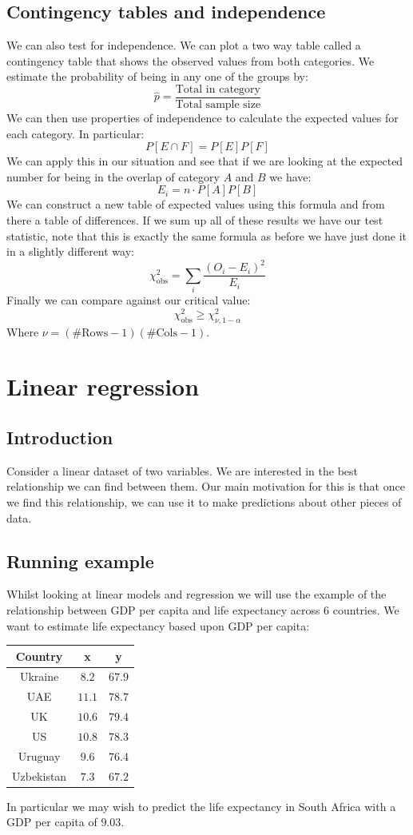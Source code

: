 \documentclass[12pt]{article}
\newcommand{\chisq}{\chi^2_{\text{obs}}}
\begin{document}
\subsection*{Contingency tables and independence}
We can also test for independence. We can plot a two way table called a contingency table that shows the observed values from both categories. We estimate the probability of being in any one of the groups by:
\[\hat{p}=\frac{\text{Total in category}}{\text{Total sample size}}\]
We can then use properties of independence to calculate the expected values for each category. In particular:
\[P[E\cap F]=P[E]P[F]\]
We can apply this in our situation and see that if we are looking at the expected number for being in the overlap of category \(A\) and \(B\) we have:
\[E_i=n\cdot P[A]P[B]\]
We can construct a new table of expected values using this formula and from there a table of differences. If we sum up all of these results we have our test statistic, note that this is exactly the same formula as before we have just done it in a slightly different way:
\[\chisq = \sum_i\frac{(O_i-E_i)^2}{E_i}\]
Finally we can compare against our critical value:
\[\chisq\geq \chi^2_{\nu,1-\alpha}\]
Where \(\nu=(\#\text{Rows}-1)(\#\text{Cols}-1)\).
\section{Linear regression}
\subsection*{Introduction}
Consider a linear dataset of two variables. We are interested in the best relationship we can find between them. Our main motivation for this is that once we find this relationship, we can use it to make predictions about other pieces of data.
\subsection*{Running example}
Whilst looking at linear models and regression we will use the example of the relationship between GDP per capita and life expectancy across 6 countries. We want to estimate life expectancy based upon GDP per capita:
\begin{table}[H]
    \centering
    \begin{tabular}{c|c|c}
        \textbf{Country} & \textbf{x} & \textbf{y} \\ \hline 
        Ukraine & \(8.2\) & \(67.9\) \\
        UAE & \(11.1\) & \(78.7\) \\
        UK & \(10.6\) & \(79.4\) \\
        US & \(10.8\) & \(78.3\) \\
        Uruguay & \(9.6\) & \(76.4\) \\
        Uzbekistan & \(7.3\) & \(67.2\)
    \end{tabular}
\end{table}
In particular we may wish to predict the life expectancy in South Africa with a GDP per capita of \(9.03\).
\end{document}
